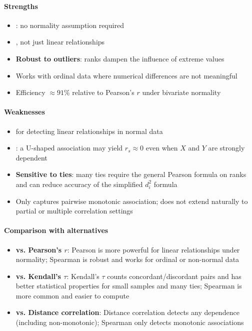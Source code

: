 \paragraph{Strengths}
\begin{itemize}
    \item {}: no normality assumption required
    \item {}, not just linear relationships
    \item \textbf{Robust to outliers}: ranks dampen the influence of extreme values
    \item Works with ordinal data where numerical differences are not meaningful
    \item Efficiency $\approx 91\%$ relative to Pearson's $r$ under bivariate normality
\end{itemize}

\paragraph{Weaknesses}
\begin{itemize}
    \item {} for detecting linear relationships in
        normal data
    \item {}: a U-shaped association may
        yield $r_s \approx 0$ even when $X$ and $Y$ are strongly dependent
    \item \textbf{Sensitive to ties}: many ties require the general Pearson formula on
        ranks and can reduce accuracy of the simplified $d_i^2$ formula
    \item Only captures pairwise monotonic association; does not extend naturally to
        partial or multiple correlation settings
\end{itemize}

\paragraph{Comparison with alternatives}
\begin{itemize}
    \item \textbf{vs. Pearson's $r$}: Pearson is more powerful for linear relationships
        under normality; Spearman is robust and works for ordinal or non-normal data
    \item \textbf{vs. Kendall's $\tau$}: Kendall's $\tau$ counts concordant/discordant
        pairs and has better statistical properties for small samples and many ties;
        Spearman is more common and easier to compute
    \item \textbf{vs. Distance correlation}: Distance correlation detects any dependence
        (including non-monotonic); Spearman only detects monotonic associations
\end{itemize}

